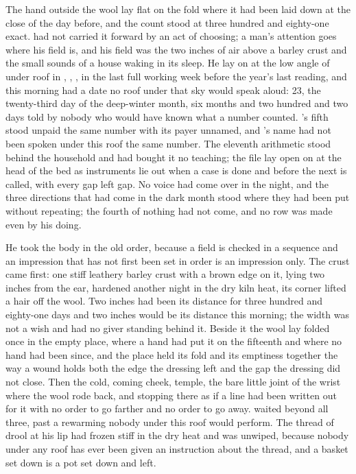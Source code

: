 
The hand outside the wool lay flat on the fold where it had been laid down at the close of the day before, and the count stood at three hundred and eighty-one exact.  had not carried it forward by an act of choosing; a man's attention goes where his field is, and his field was the two inches of air above a barley crust and the small sounds of a house waking in its sleep. He lay on  at the low angle of  under  roof in , , , in the last full working week before the year's last reading, and this morning had a date no roof under that sky would speak aloud:  23, the twenty-third day of the deep-winter month, six months and two hundred and two days told by nobody who would have known what a number counted. 's fifth stood unpaid the same number with its payer unnamed, and 's name had not been spoken under this roof the same number. The eleventh arithmetic stood behind the household and had bought it no teaching; the file lay open on  at the head of the bed as instruments lie out when a case is done and before the next is called, with every gap left gap. No voice had come over  in the night, and the three directions that had come in the dark month stood where they had been put without repeating; the fourth of nothing had not come, and no row was made even by his doing.

He took the body in the old order, because a field is checked in a sequence and an impression that has not first been set in order is an impression only. The crust came first: one stiff leathery barley crust with a brown edge on it, lying two inches from the ear, hardened another night in the dry kiln heat, its corner lifted a hair off the wool. Two inches had been its distance for three hundred and eighty-one days and two inches would be its distance this morning; the width was not a wish and had no giver standing behind it. Beside it the wool lay folded once in the empty place, where a hand had put it on the fifteenth and where no hand had been since, and the place held its fold and its emptiness together the way a wound holds both the edge the dressing left and the gap the dressing did not close. Then the cold, coming cheek, temple, the bare little joint of the wrist where the wool rode back, and stopping there as if a line had been written out for it with no order to go farther and no order to go away.  waited beyond all three, past a rewarming nobody under this roof would perform. The thread of drool at his lip had frozen stiff in the dry heat and was unwiped, because nobody under any roof has ever been given an instruction about the thread, and a basket set down is a pot set down and left.

